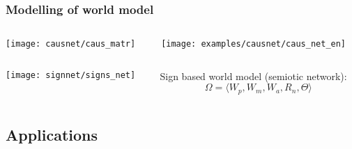 \documentclass[default]{beamer}
\begin{document}
	\begin{frame}
		\frametitle{Modelling of world model}
		\begin{columns}
			\begin{column}{0.5\textwidth}
				\centering
				\texttt{[image: causnet/caus\_matr]}
				
				
			\end{column}
			\begin{column}{0.5\textwidth}
				\centering
				\texttt{[image: examples/causnet/caus\_net\_en]}
			\end{column}
		\end{columns}
		\begin{columns}
			\begin{column}{0.5\textwidth}
				\centering
				\texttt{[image: signnet/signs\_net]}
			\end{column}
			\begin{column}{0.5\textwidth}
				Sign based world model (semiotic network):
				\[\Omega=\langle W_p, W_m, W_a, R_n, \Theta \rangle\]
				
				\vspace{-5pt}
				\nocite{*}
				\printbibliography[keyword={signmodel}, resetnumbers=true]
			\end{column}
		\end{columns}
	\end{frame}

	\subsection{Applications}
	
\end{document}
